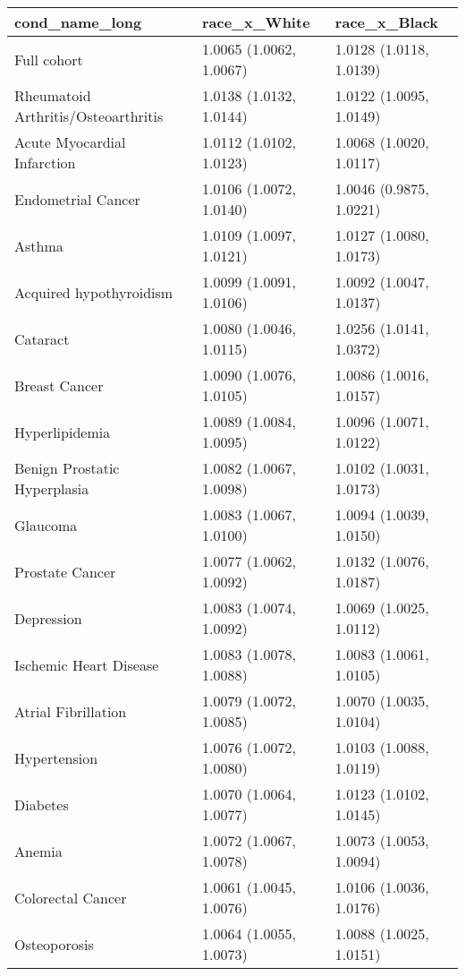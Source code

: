\begin{table}[ht]
\centering
\begin{tabular}{lll}
  \hline
cond_name_long & race_x_White & race_x_Black \\ 
  \hline
Full cohort & 1.0065 (1.0062, 1.0067) & 1.0128 (1.0118, 1.0139) \\ 
  Rheumatoid Arthritis/Osteoarthritis & 1.0138 (1.0132, 1.0144) & 1.0122 (1.0095, 1.0149) \\ 
  Acute Myocardial Infarction & 1.0112 (1.0102, 1.0123) & 1.0068 (1.0020, 1.0117) \\ 
  Endometrial Cancer & 1.0106 (1.0072, 1.0140) & 1.0046 (0.9875, 1.0221) \\ 
  Asthma & 1.0109 (1.0097, 1.0121) & 1.0127 (1.0080, 1.0173) \\ 
  Acquired hypothyroidism & 1.0099 (1.0091, 1.0106) & 1.0092 (1.0047, 1.0137) \\ 
  Cataract & 1.0080 (1.0046, 1.0115) & 1.0256 (1.0141, 1.0372) \\ 
  Breast Cancer & 1.0090 (1.0076, 1.0105) & 1.0086 (1.0016, 1.0157) \\ 
  Hyperlipidemia & 1.0089 (1.0084, 1.0095) & 1.0096 (1.0071, 1.0122) \\ 
  Benign Prostatic Hyperplasia & 1.0082 (1.0067, 1.0098) & 1.0102 (1.0031, 1.0173) \\ 
  Glaucoma & 1.0083 (1.0067, 1.0100) & 1.0094 (1.0039, 1.0150) \\ 
  Prostate Cancer & 1.0077 (1.0062, 1.0092) & 1.0132 (1.0076, 1.0187) \\ 
  Depression & 1.0083 (1.0074, 1.0092) & 1.0069 (1.0025, 1.0112) \\ 
  Ischemic Heart Disease & 1.0083 (1.0078, 1.0088) & 1.0083 (1.0061, 1.0105) \\ 
  Atrial Fibrillation & 1.0079 (1.0072, 1.0085) & 1.0070 (1.0035, 1.0104) \\ 
  Hypertension & 1.0076 (1.0072, 1.0080) & 1.0103 (1.0088, 1.0119) \\ 
  Diabetes & 1.0070 (1.0064, 1.0077) & 1.0123 (1.0102, 1.0145) \\ 
  Anemia & 1.0072 (1.0067, 1.0078) & 1.0073 (1.0053, 1.0094) \\ 
  Colorectal Cancer & 1.0061 (1.0045, 1.0076) & 1.0106 (1.0036, 1.0176) \\ 
  Osteoporosis & 1.0064 (1.0055, 1.0073) & 1.0088 (1.0025, 1.0151) \\ 

\end{tabular}
\end{table}
